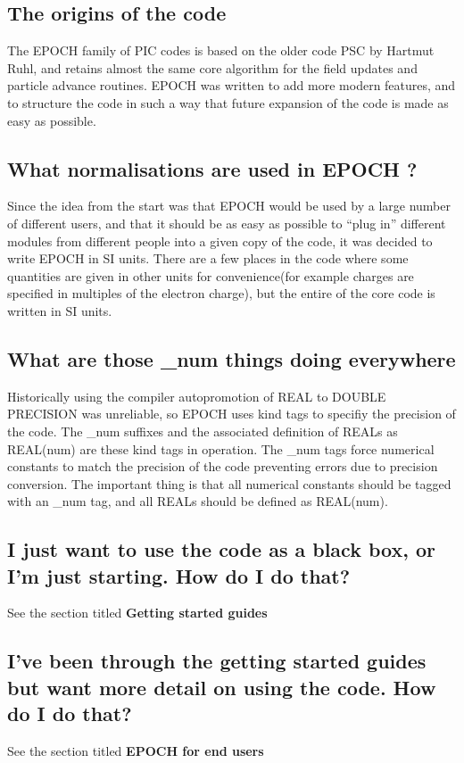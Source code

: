 \documentclass[12pt]{article}
\newcommand{\EPOCH}{{\color{warwickdark}\fontfamily{phv}\selectfont EPOCH} }
\begin{document}
\subsection{The origins of the code}
The \EPOCH family of PIC codes is based on the older code PSC by Hartmut Ruhl,
and retains almost the same core algorithm for the field updates and particle
advance routines. \EPOCH was written to add more modern features, and to
structure the code in such a way that future expansion of the code is made as
easy as possible.

\subsection{What normalisations are used in \EPOCH?}
Since the idea from the start was that \EPOCH would be used by a large number
of different users, and that it should be as easy as possible to ``plug in''
different modules from different people into a given copy of the code, it was
decided to write \EPOCH in SI units. There are a few places in the code where
some quantities are given in other units for convenience(for example charges
are specified in multiples of the electron charge), but the entire of the core
code is written in SI units.

\subsection{What are those \_num things doing everywhere}
Historically using the compiler autopromotion of REAL to DOUBLE PRECISION was
unreliable, so \EPOCH uses kind tags to specifiy the precision of the code. The
\_num suffixes and the associated definition of REALs as REAL(num) are these
kind tags in operation. The \_num tags force numerical constants to match the
precision of the code preventing errors due to precision conversion. The
important thing is that all numerical constants should be tagged with an \_num
tag, and all REALs should be defined as REAL(num).

\subsection{I just want to use the code as a black box, or I'm just
  starting. How do I do that?}
See the section titled {\bf Getting started guides}

\subsection{I've been through the getting started guides but want more detail
  on using the code. How do I do that?}
See the section titled {\bf \EPOCH for end users}
\end{document}
